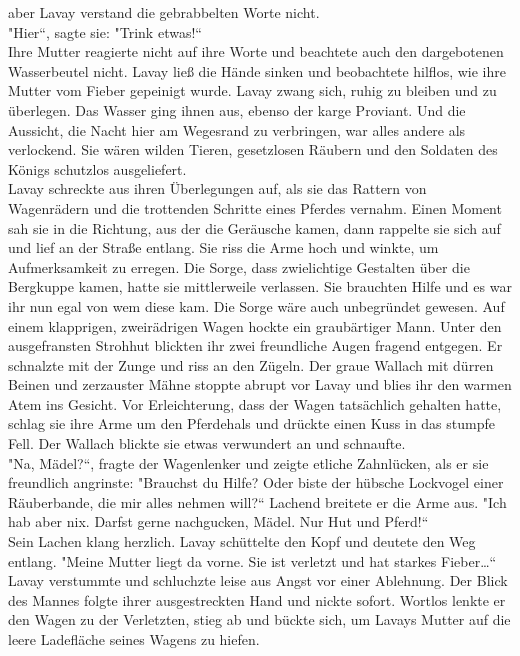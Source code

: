 aber Lavay verstand die gebrabbelten Worte nicht.\\
"Hier``, sagte sie: "Trink etwas!``\\
Ihre Mutter reagierte nicht auf ihre Worte und beachtete auch den dargebotenen Wasserbeutel nicht. 
Lavay ließ die Hände sinken und beobachtete hilflos, wie ihre Mutter vom Fieber gepeinigt wurde. 
Lavay zwang sich, ruhig zu bleiben und zu überlegen. Das Wasser ging ihnen aus, ebenso der karge 
Proviant. Und die Aussicht, die Nacht hier am Wegesrand zu verbringen, war alles andere als 
verlockend. Sie wären wilden Tieren, gesetzlosen Räubern und den Soldaten des Königs schutzlos 
ausgeliefert. \\

Lavay schreckte aus ihren Überlegungen auf, als sie das Rattern von Wagenrädern und die trottenden 
Schritte eines Pferdes vernahm. Einen Moment sah sie in die Richtung, aus der die Geräusche kamen, 
dann rappelte sie sich auf und lief an der Straße entlang. Sie riss die Arme hoch und winkte, um 
Aufmerksamkeit zu erregen. Die Sorge, dass zwielichtige Gestalten über die Bergkuppe kamen, hatte 
sie mittlerweile verlassen. Sie brauchten Hilfe und es war ihr nun egal von wem diese kam. Die 
Sorge wäre auch unbegründet gewesen. Auf einem klapprigen, zweirädrigen Wagen hockte ein 
graubärtiger Mann. Unter den ausgefransten Strohhut blickten ihr zwei freundliche Augen fragend 
entgegen. Er schnalzte mit der Zunge und riss an den Zügeln. Der graue Wallach mit dürren Beinen 
und zerzauster Mähne stoppte abrupt vor Lavay und blies ihr den warmen Atem ins Gesicht. Vor 
Erleichterung, dass der Wagen tatsächlich gehalten hatte, schlag sie ihre Arme um den Pferdehals 
und drückte einen Kuss in das stumpfe Fell. Der Wallach blickte sie etwas verwundert an und 
schnaufte.\\
"Na, Mädel?``, fragte der Wagenlenker und zeigte etliche Zahnlücken, als er sie freundlich 
angrinste: "Brauchst du Hilfe? Oder biste der hübsche Lockvogel einer Räuberbande, die mir alles 
nehmen will?`` Lachend breitete er die Arme aus. "Ich hab aber nix. Darfst gerne nachgucken, Mädel. 
Nur Hut und Pferd!``\\
Sein Lachen klang herzlich. Lavay schüttelte den Kopf und deutete den Weg entlang. "Meine Mutter 
liegt da vorne. Sie ist verletzt und hat starkes Fieber…``\\
Lavay verstummte und schluchzte leise aus Angst vor einer Ablehnung. Der Blick des Mannes folgte 
ihrer ausgestreckten Hand und nickte sofort. Wortlos lenkte er den Wagen zu der Verletzten, stieg ab 
und bückte sich, um Lavays Mutter auf die leere Ladefläche seines Wagens zu hiefen.\\

